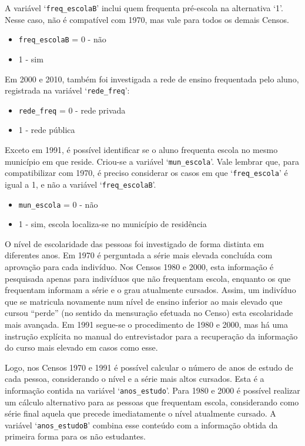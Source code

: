 \documentclass[12pt,a4paper]{article}
\newcommand{\vr}[1]{\texttt{#1}}
\begin{document}
A variável ‘\vr{freq\_escolaB}’ inclui quem frequenta pré-escola na alternativa ‘1’. Nesse caso, não é compatível com 1970, mas vale para todos os demais Censos.
\begin{itemize}
  \item \vr{freq\_escolaB} = 0 - não
  \item 1 - sim
\end{itemize}

Em 2000 e 2010, também foi investigada a rede de ensino frequentada pelo aluno, registrada na variável ‘\vr{rede\_freq}’:
\begin{itemize}
  \item \vr{rede\_freq} = 0 - rede privada
  \item 1 - rede pública
\end{itemize}

Exceto em 1991, é possível identificar se o aluno frequenta escola no mesmo município em que reside. Criou-se a variável ‘\vr{mun\_escola}’. Vale lembrar que, para compatibilizar com 1970, é preciso considerar os casos em que ‘\vr{freq\_escola}’ é igual a 1, e não a variável ‘\vr{freq\_escolaB}’.
\begin{itemize}
  \item \vr{mun\_escola} = 0 - não
  \item 1 - sim, escola localiza-se no município de residência
\end{itemize}

O nível de escolaridade das pessoas foi investigado de forma distinta em diferentes anos. Em 1970 é perguntada a série mais elevada concluída com aprovação para cada indivíduo. Nos Censos 1980 e 2000, esta informação é pesquisada apenas para indivíduos que não frequentam escola, enquanto os que frequentam informam a série e o grau atualmente cursados. Assim, um indivíduo que se matricula novamente num nível de ensino inferior ao mais elevado que cursou “perde” (no sentido da mensuração efetuada no Censo) esta escolaridade mais avançada. Em 1991 segue-se o procedimento de 1980 e 2000, mas há uma instrução explícita no manual do entrevistador para a recuperação da informação do curso mais elevado em casos como esse.

Logo, nos Censos 1970 e 1991 é possível calcular o número de anos de estudo de cada pessoa, considerando o nível e a série mais altos cursados. Esta é a informação contida na variável ‘\vr{anos\_estudo}’. Para 1980 e 2000 é possível realizar um cálculo alternativo para as pessoas que frequentam escola, considerando como série final aquela que precede imediatamente o nível atualmente cursado. A variável ‘\vr{anos\_estudoB}’ combina esse conteúdo com a informação obtida da primeira forma para os não estudantes.
\end{document}

